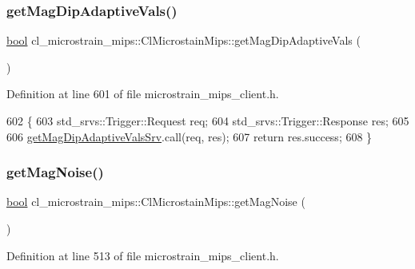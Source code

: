 \subsubsection{\texorpdfstring{get\+Mag\+Dip\+Adaptive\+Vals()}{getMagDipAdaptiveVals()}}
{\footnotesize\ttfamily \hyperlink{classbool}{bool} cl\+\_\+microstrain\+\_\+mips\+::\+Cl\+Microstain\+Mips\+::get\+Mag\+Dip\+Adaptive\+Vals (\begin{DoxyParamCaption}{ }\end{DoxyParamCaption})\hspace{0.3cm}{\ttfamily [inline]}}



Definition at line 601 of file microstrain\+\_\+mips\+\_\+client.\+h.


\begin{DoxyCode}
602     \{
603         std\_srvs::Trigger::Request req;
604         std\_srvs::Trigger::Response res;
605 
606         \hyperlink{classcl__microstrain__mips_1_1ClMicrostainMips_aa5a412d1343febccf6bda432eacb0581}{getMagDipAdaptiveValsSrv}.call(req, res);
607         \textcolor{keywordflow}{return} res.success;
608     \}
\end{DoxyCode}
\mbox{\label{classcl__microstrain__mips_1_1ClMicrostainMips_aaa3a569e4b555b0db5b3f3d02ae1b33e}} 
\subsubsection{\texorpdfstring{get\+Mag\+Noise()}{getMagNoise()}}
{\footnotesize\ttfamily \hyperlink{classbool}{bool} cl\+\_\+microstrain\+\_\+mips\+::\+Cl\+Microstain\+Mips\+::get\+Mag\+Noise (\begin{DoxyParamCaption}{ }\end{DoxyParamCaption})\hspace{0.3cm}{\ttfamily [inline]}}



Definition at line 513 of file microstrain\+\_\+mips\+\_\+client.\+h.


